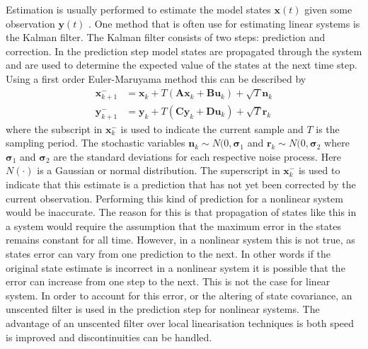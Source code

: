 Estimation is usually performed to estimate the model states $\mathbf{x}(t)$ given some observation $\mathbf{y}(t)$ . One method that is often use for estimating linear systems is the Kalman filter. The Kalman filter consists of two steps: prediction and correction. In the prediction step model states are propagated through the system and are used to determine the expected value of the states at the next time step. Using a first order Euler-Maruyama method this can be described by \begin{align}
\label{eqn: StateProgL}
\mathbf{x}_{k+1}^{-} &= \mathbf{x}_{k} + T(\mathbf{A}\mathbf{x}_{k} +\mathbf{B}\mathbf{u}_{k})+\sqrt{T}\mathbf{n}_{k}\\
\label{eqn: YProp}
\mathbf{y}_{k+1}^{-}  &= \mathbf{y}_{k} + T(\mathbf{C}\mathbf{y}_{k}+\mathbf{D}\mathbf{u}_{k}) +\sqrt{T}\mathbf{r}_{k}
\end{align} where the subscript in $\mathbf{x}_{k}^{-}$ is used to indicate the current sample and $T$ is the sampling period. The stochastic variables $\mathbf{n}_{k}\sim N(0,\mathbf{\sigma}_{1}$ and $\mathbf{r}_{k}\sim N(0,\mathbf{\sigma}_{2}$ where $\mathbf{\sigma}_{1}$ and $\mathbf{\sigma}_2$ are the standard deviations for each respective noise process. Here $N(\cdot)$ is a Gaussian or normal distribution. The superscript in $\mathbf{x}_{k}^{-}$ is used to indicate that this estimate is a prediction that has not yet been corrected by the current observation. Performing this kind of prediction for a nonlinear system would be inaccurate. The reason for this is that propagation of states like this in a system would require the assumption that the maximum error in the states remains constant for all time. However, in a nonlinear system this is not true, as states error can vary from one prediction to the next. In other words if the original state estimate is incorrect in a nonlinear system it is possible that the error can increase from one step to the next. This is not the case for linear system. In order to account for this error, or the altering of state covariance, an unscented filter is used in the prediction step for nonlinear systems. The advantage of an unscented filter over local linearisation techniques is both speed is improved and discontinuities can be handled. 


